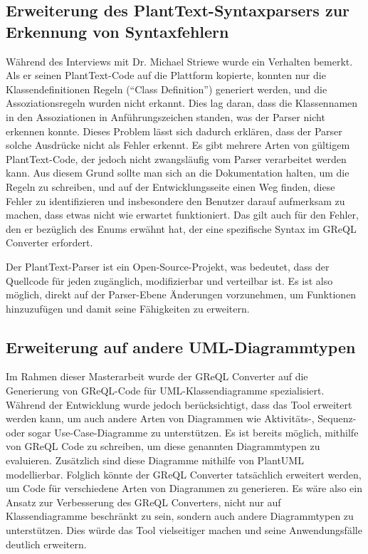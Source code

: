 \subsection{Erweiterung des PlantText-Syntaxparsers zur Erkennung von Syntaxfehlern}

Während des Interviews mit Dr. Michael Striewe wurde ein Verhalten bemerkt. Als er seinen PlantText-Code auf die
Plattform kopierte, konnten nur die Klassendefinitionen Regeln (``Class Definition'') generiert werden, und die
Assoziationsregeln wurden nicht erkannt. Dies lag daran, dass die Klassennamen in den Assoziationen in
Anführungszeichen standen, was der Parser nicht erkennen konnte. Dieses Problem lässt sich dadurch erklären, dass der
Parser solche Ausdrücke nicht als Fehler erkennt. Es gibt mehrere Arten von gültigem PlantText-Code, der jedoch nicht
zwangsläufig vom Parser verarbeitet werden kann. Aus diesem Grund sollte man sich an die Dokumentation halten, um die
Regeln zu schreiben, und auf der Entwicklungsseite einen Weg finden, diese Fehler zu identifizieren und insbesondere den
Benutzer darauf aufmerksam zu machen, dass etwas nicht wie erwartet funktioniert. Das gilt auch für den Fehler, den er
bezüglich des Enums erwähnt hat, der eine spezifische Syntax im GReQL Converter erfordert.


Der PlantText-Parser ist ein Open-Source-Projekt, was bedeutet, dass der Quellcode für jeden zugänglich,
modifizierbar und verteilbar ist. Es ist also möglich, direkt auf der Parser-Ebene Änderungen vorzunehmen, um Funktionen
hinzuzufügen und damit seine Fähigkeiten zu erweitern.


\subsection{Erweiterung auf andere UML-Diagrammtypen}

Im Rahmen dieser Masterarbeit wurde der GReQL Converter auf die Generierung von GReQL-Code für UML-Klassendiagramme
spezialisiert. Während der Entwicklung wurde jedoch berücksichtigt, dass das Tool erweitert werden kann, um auch andere
Arten von Diagrammen wie Aktivitäts-, Sequenz- oder sogar Use-Case-Diagramme zu unterstützen. Es ist bereits möglich,
mithilfe von GReQL Code zu schreiben, um diese genannten Diagrammtypen zu evaluieren. Zusätzlich sind diese Diagramme
mithilfe von PlantUML modellierbar. Folglich könnte der GReQL Converter tatsächlich erweitert werden, um Code für
verschiedene Arten von Diagrammen zu generieren. Es wäre also ein Ansatz zur Verbesserung des GReQL Converters, nicht
nur auf Klassendiagramme beschränkt zu sein, sondern auch andere Diagrammtypen zu unterstützen. Dies würde das Tool
vielseitiger machen und seine Anwendungsfälle deutlich erweitern.


